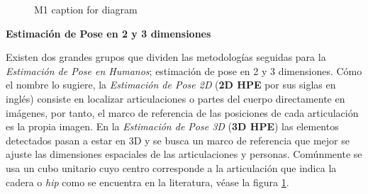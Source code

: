 \begin{figure}
\begin{center}
\begin{tikzpicture}
\end{tikzpicture}
\caption{M1 caption for diagram} \label{fig:HPE-diagram}
\end{center} \end{figure}

\textbf{Estimación de Pose en 2 y 3 dimensiones}

Existen dos grandes grupos que dividen las metodologías seguidas para la \textit{Estimación de Pose en
Humanos}; estimación de pose en 2 y 3 dimensiones. Cómo el nombre lo sugiere, la \textit{Estimación
de Pose 2D} (\textbf{2D HPE} por sus siglas en inglés) consiste en localizar articulaciones o partes del cuerpo
directamente en imágenes, por tanto, el marco de referencia de las posiciones de cada articulación es la
propia imagen. En la \textit{Estimación de Pose 3D} (\textbf{3D HPE}) las elementos detectados pasan a estar en 3D
y se busca un marco de referencia que mejor se ajuste las dimensiones espaciales de las
articulaciones y personas. Comúnmente se usa un cubo unitario cuyo centro corresponde a la
articulación que indica la cadera o \textit{hip} como se encuentra en la literatura, véase la figura
\ref{fig:HPE-diagram}.

